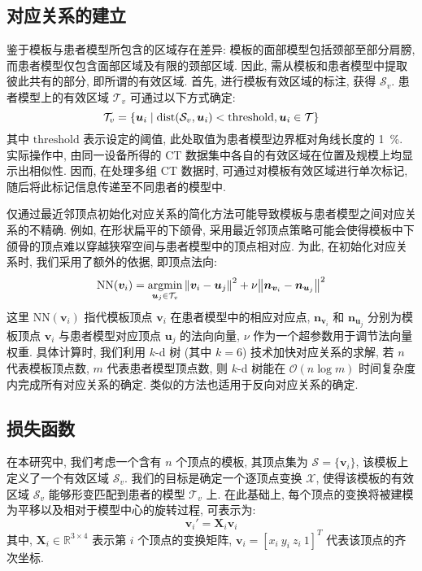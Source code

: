 \subsection{对应关系的建立}

鉴于模板与患者模型所包含的区域存在差异: 模板的面部模型包括颈部至部分肩膀, 而患者模型仅包含面部区域及有限的颈部区域.
因此, 需从模板和患者模型中提取彼此共有的部分, 即所谓的有效区域.
首先, 进行模板有效区域的标注, 获得 $\mathcal{S}_v$.
患者模型上的有效区域 $\mathcal{T}_v$ 可通过以下方式确定:
\begin{equation}
  \mathcal{T}_v = \Bqty{\bm{u}_i \mid \dist(\mathcal{S}_v, \bm{u}_i) < \mathrm{threshold}, \bm{u}_i \in \mathcal{T}}
\end{equation}
其中 $\mathrm{threshold}$ 表示设定的阈值, 此处取值为患者模型边界框对角线长度的 \SI{1}{\percent}.
实际操作中, 由同一设备所得的 CT 数据集中各自的有效区域在位置及规模上均显示出相似性.
因而, 在处理多组 CT 数据时, 可通过对模板有效区域进行单次标记, 随后将此标记信息传递至不同患者的模型中.

仅通过最近邻顶点初始化对应关系的简化方法可能导致模板与患者模型之间对应关系的不精确.
例如, 在形状扁平的下颌骨, 采用最近邻顶点策略可能会使得模板中下颌骨的顶点难以穿越狭窄空间与患者模型中的顶点相对应.
为此, 在初始化对应关系时, 我们采用了额外的依据, 即顶点法向:
\begin{equation}
  \mathrm{NN}(\bm{v}_i) = \operatorname*{argmin}_{\bm{u}_j \in \mathcal{T}_v} \norm{\bm{v}_i - \bm{u}_j}^2 + \nu \norm{\bm{n}_{\bm{v}_i} - \bm{n}_{\bm{u}_j}}^2
\end{equation}
这里 $\mathrm{NN}(\bm{v}_i)$ 指代模板顶点 $\bm{v}_i$ 在患者模型中的相应对应点, $\bm{n}_{\bm{v}_i}$ 和 $\bm{n}_{\bm{u}_j}$ 分别为模板顶点 $\bm{v}_i$ 与患者模型对应顶点 $\bm{u}_j$ 的法向向量, $\nu$ 作为一个超参数用于调节法向量权重.
具体计算时, 我们利用 $k$-d 树 (其中 $k = 6$) 技术加快对应关系的求解, 若 $n$ 代表模板顶点数, $m$ 代表患者模型顶点数, 则 $k$-d 树能在 $\mathcal{O}(n \log{m})$ 时间复杂度内完成所有对应关系的确定.
类似的方法也适用于反向对应关系的确定.

\subsection{损失函数}

在本研究中, 我们考虑一个含有 $n$ 个顶点的模板, 其顶点集为 $\mathcal{S} = \{\bm{v}_i\}$, 该模板上定义了一个有效区域 $\mathcal{S}_v$.
我们的目标是确定一个逐顶点变换 $\mathcal{X}$, 使得该模板的有效区域 $\mathcal{S}_v$ 能够形变匹配到患者的模型 $\mathcal{T}_v$ 上.
在此基础上, 每个顶点的变换将被建模为平移以及相对于模型中心的旋转过程, 可表示为:
\begin{equation}
  \bm{v}_i' = \bm{X}_i \bm{v}_i
\end{equation}
其中, $\bm{X}_i \in \mathbb{R}^{3 \times 4}$ 表示第 $i$ 个顶点的变换矩阵, $\bm{v}_i = [x_i ~ y_i ~ z_i ~ 1]^T$ 代表该顶点的齐次坐标.

